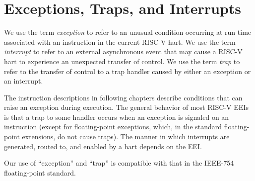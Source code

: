 \section{Exceptions, Traps, and Interrupts}

We use the term {\em exception} to refer to an unusual condition
occurring at run time associated with an instruction in the current
RISC-V hart.  We use the term {\em interrupt} to refer to an external
asynchronous event that may cause a RISC-V hart to experience an
unexpected transfer of control.  We use the term {\em trap} to refer
to the transfer of control to a trap handler caused by either an
exception or an interrupt.

The instruction descriptions in following chapters describe conditions
that can raise an exception during execution.  The general behavior of
most RISC-V EEIs is that a trap to some handler occurs when an
exception is signaled on an instruction (except for floating-point
exceptions, which, in the standard floating-point extensions, do not
cause traps).  The manner in which interrupts are generated, routed
to, and enabled by a hart depends on the EEI.

\begin{commentary}
Our use of ``exception'' and ``trap'' is compatible with that in the IEEE-754
floating-point standard.
\end{commentary}

